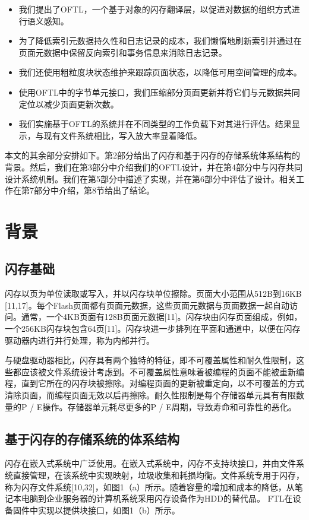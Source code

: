 \begin{itemize}
\item 我们提出了OFTL，一个基于对象的闪存翻译层，以促进对数据的组织方式进行语义感知。
\item 为了降低索引元数据持久性和日志记录的成本，我们懒惰地刷新索引并通过在页面元数据中保留反向索引和事务信息来消除日志记录。
\item 我们还使用粗粒度块状态维护来跟踪页面状态，以降低可用空间管理的成本。
\item 使用OFTL中的字节单元接口，我们压缩部分页面更新并将它们与元数据共同定位以减少页面更新次数。
\item 我们实施基于OFTL的系统并在不同类型的工作负载下对其进行评估。结果显示，与现有文件系统相比，写入放大率显着降低。
\end{itemize}

本文的其余部分安排如下。第2部分给出了闪存和基于闪存的存储系统体系结构的背景。然后，我们在第3部分中介绍我们的OFTL设计，并在第4部分中与闪存共同设计系统机制。我们在第5部分中描述了实现，并在第6部分中评估了设计。相关工作在第7部分中介绍，第8节给出了结论。

\section{背景}
\subsection{闪存基础}
闪存以页为单位读取或写入，并以闪存块单位擦除。页面大小范围从512B到16KB [11,17]。每个Flash页面都有页面元数据，这些页面元数据与页面数据一起自动访问。通常，一个4KB页面有128B页面元数据[11]。闪存块由闪存页面组成，例如，一个256KB闪存块包含64页[11]。闪存块进一步排列在平面和通道中，以便在闪存驱动器内进行并行处理，称为内部并行。

与硬盘驱动器相比，闪存具有两个独特的特征，即不可覆盖属性和耐久性限制，这些都应该被文件系统设计考虑到。不可覆盖属性意味着被编程的页面不能被重新编程，直到它所在的闪存块被擦除。对编程页面的更新被重定向，以不可覆盖的方式清除页面，而编程页面无效以后再擦除。耐久性限制是每个存储器单元具有有限数量的P / E操作。存储器单元耗尽更多的P / E周期，导致寿命和可靠性的恶化。

\subsection{基于闪存的存储系统的体系结构}
闪存在嵌入式系统中广泛使用。在嵌入式系统中，闪存不支持块接口，并由文件系统直接管理，在该系统中实现映射，垃圾收集和耗损均衡。文件系统专用于闪存，称为闪存文件系统[10,32]，如图1（a）所示。随着容量的增加和成本的降低，从笔记本电脑到企业服务器的计算机系统采用闪存设备作为HDD的替代品。 FTL在设备固件中实现以提供块接口，如图1（b）所示。

